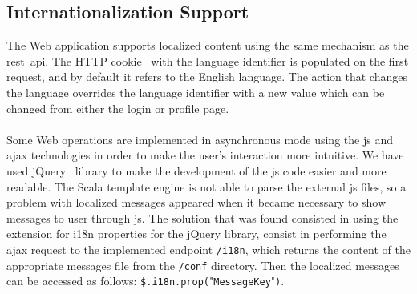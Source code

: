 \subsection{Internationalization Support}
\label{subsec:webAppInternationaization}
The Web application supports localized content using the same mechanism as the \gls{rest}~\gls{api}. The HTTP cookie~\cite{httpCookie} with the language identifier is populated on the first request, and by default it refers to the English language. The action that changes the language overrides the language identifier with a new value which can be changed from either the login or profile page.\\
\\
Some Web operations are implemented in asynchronous mode using the \gls{js} and \gls{ajax} technologies in order to make the user's interaction more intuitive. We have used jQuery~\cite{jquery} library to make the development of the \gls{js} code easier and more readable. The Scala template engine is not able to parse the external \gls{js} files, so a problem with localized messages appeared when it became necessary to show messages to user through \gls{js}. The solution that was found consisted in using the extension for i18n properties for the jQuery library, consist in performing the \gls{ajax} request to the implemented endpoint \verb"/i18n", which returns the content of the appropriate messages file from the \verb"/conf" directory. Then the localized messages can be accessed as follows: \verb"$.i18n.prop(""\verb"MessageKey""\verb")".
